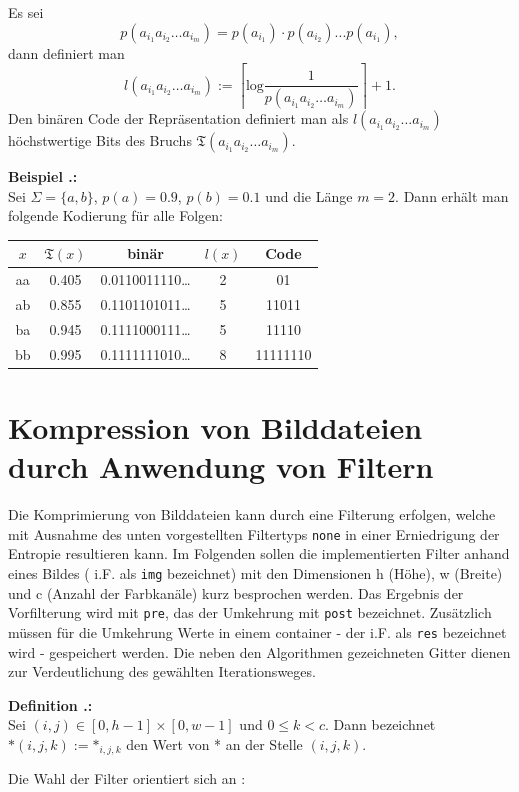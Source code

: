 \documentclass[a4paper,12pt]{article}
\newcounter{Definition}
\newcounter{Beispiel}
\newenvironment{Definition}{
\bigskip
        
        \setlength{\parindent}{0pt}
        \addtocounter{Definition}{1}
        \textbf{\textsf{Definition \thesubsection.\theDefinition}:}\\}{
        \nopagebreak
        \vspace{-1.0ex}
        \bigskip
        
}
\newenvironment{Beispiel}{
\medskip
        
        \setlength{\parindent}{0pt}
        \addtocounter{Beispiel}{1}
        \textbf{\textsf{Beispiel \thesubsection.\theBeispiel}:}\\}{
        \nopagebreak
        \vspace{-1.0ex}
        \bigskip
        
}
\begin{document}
\par
Es sei
$$
 p(a_{i_{1}}a_{i_{2}}\ldots a_{i_{m}}) = p(a_{i_{1}})·p(a_{i_{2}})...p(a_{i_{1}}),
$$
dann definiert man 
$$
l(a_{i_{1}}a_{i_{2}}\ldots a_{i_{m}}):=\left\lceil \text{log}\frac{1}{p(a_{i_{1}}a_{i_{2}}\ldots a_{i_{m}}) }\right\rceil + 1.
$$
Den binären Code der Repräsentation definiert man als $l(a_{i_{1}}a_{i_{2}}\ldots a_{i_{m}})$ höchstwertige Bits des Bruchs $\mathfrak{T}(a_{i_{1}}a_{i_{2}}\ldots a_{i_{m}})$. 
\begin{Beispiel}
Sei $\Sigma = \{a,b\}$, $p(a)=0.9$, $p(b)=0.1$ und die Länge $m=2$. Dann erhält man folgende Kodierung für alle Folgen:
\begin{center}
\begin{tabular}{c|c|c|c|c}
$x$ & $\mathfrak{T}(x)$ & binär & $l(x)$  & Code
\\
\hline
aa & 0.405 & 0.0110011110\ldots &  2 & 01
\\
\hline
ab & 0.855 & 0.1101101011\ldots & 5 & 11011
\\
\hline
ba & 0.945 & 0.1111000111\ldots & 5 & 11110
\\
\hline
bb & 0.995 &0.1111111010\ldots & 8 & 11111110
\end{tabular}
\end{center}
\end{Beispiel}
\newpage
\section{Kompression von Bilddateien durch Anwendung von Filtern}\label{Filter}
Die Komprimierung von Bilddateien kann durch eine Filterung erfolgen, welche mit Ausnahme des unten vorgestellten Filtertyps {\tt{none}} in einer Erniedrigung der Entropie resultieren kann. Im Folgenden sollen die implementierten Filter anhand eines Bildes ( i.F. als {\tt{img}} bezeichnet) mit den Dimensionen  h (Höhe), w (Breite) und c (Anzahl der Farbkanäle) kurz besprochen werden. Das Ergebnis der Vorfilterung wird mit {\tt{pre}}, das der Umkehrung mit {\tt{post}} bezeichnet. Zusätzlich müssen für die Umkehrung  Werte in einem container - der i.F. als {\tt{res}} bezeichnet wird - gespeichert werden. Die neben den Algorithmen gezeichneten Gitter dienen zur Verdeutlichung des gewählten Iterationsweges.

\begin{Definition}
Sei  $(i,j) \in [0, h-1]\times[0, w-1]$ und $0\leq k < c$.
Dann bezeichnet  $\text{*}(i,j,k):=\text{*}_{i,j,k}$ den Wert von * an der Stelle $(i,j,k)$.
\end{Definition}
Die Wahl der Filter orientiert sich an \cite{png}:
\end{document}
